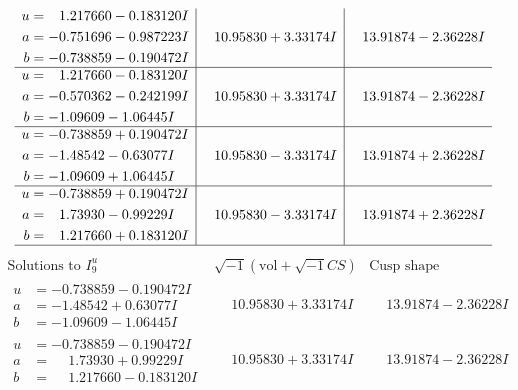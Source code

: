 \documentclass[1p]{elsarticle_modified}
\theoremstyle{definition}
\newcommand{\I}{\sqrt{-1}}
\begin{document}
$$\begin{array}{c|c|c}
\begin{aligned}
u &= \phantom{-}1.217660 - 0.183120 I \\
a &= -0.751696 - 0.987223 I \\
b &= -0.738859 - 0.190472 I\end{aligned}
 & \phantom{-}10.95830 + 3.33174 I & \phantom{-}13.91874 - 2.36228 I \\ \hline\begin{aligned}
u &= \phantom{-}1.217660 - 0.183120 I \\
a &= -0.570362 - 0.242199 I \\
b &= -1.09609 - 1.06445 I\end{aligned}
 & \phantom{-}10.95830 + 3.33174 I & \phantom{-}13.91874 - 2.36228 I \\ \hline\begin{aligned}
u &= -0.738859 + 0.190472 I \\
a &= -1.48542 - 0.63077 I \\
b &= -1.09609 + 1.06445 I\end{aligned}
 & \phantom{-}10.95830 - 3.33174 I & \phantom{-}13.91874 + 2.36228 I \\ \hline\begin{aligned}
u &= -0.738859 + 0.190472 I \\
a &= \phantom{-}1.73930 - 0.99229 I \\
b &= \phantom{-}1.217660 + 0.183120 I\end{aligned}
 & \phantom{-}10.95830 - 3.33174 I & \phantom{-}13.91874 + 2.36228 I\\
 \hline 
 \end{array}$$\newpage$$\begin{array}{c|c|c}  
\text{Solutions to }I^u_{9}& \I (\text{vol} + \sqrt{-1}CS) & \text{Cusp shape}\\
 \hline 
\begin{aligned}
u &= -0.738859 - 0.190472 I \\
a &= -1.48542 + 0.63077 I \\
b &= -1.09609 - 1.06445 I\end{aligned}
 & \phantom{-}10.95830 + 3.33174 I & \phantom{-}13.91874 - 2.36228 I \\ \hline\begin{aligned}
u &= -0.738859 - 0.190472 I \\
a &= \phantom{-}1.73930 + 0.99229 I \\
b &= \phantom{-}1.217660 - 0.183120 I\end{aligned}
 & \phantom{-}10.95830 + 3.33174 I & \phantom{-}13.91874 - 2.36228 I \\ \hline\begin{aligned}

\end{aligned}
\end{array}$$
\end{document}
